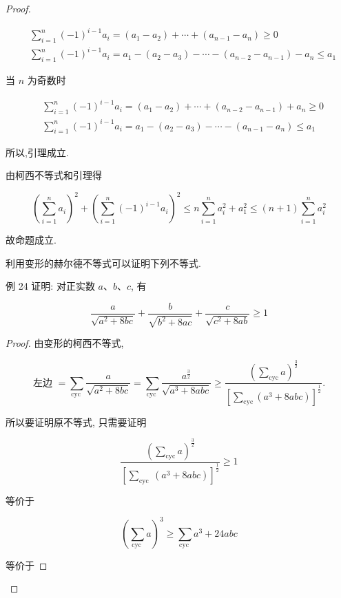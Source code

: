 \begin{proof}
\begin{example}
\begin{example}
	$$
	\begin{aligned}
	& \sum_{i=1}^{n}(-1)^{i-1} a_{i}=\left(a_{1}-a_{2}\right)+\cdots+\left(a_{n-1}-a_{n}\right) \geqslant 0 \\
	& \sum_{i=1}^{n}(-1)^{i-1} a_{i}=a_{1}-\left(a_{2}-a_{3}\right)-\cdots-\left(a_{n-2}-a_{n-1}\right)-a_{n} \leqslant a_{1}
	\end{aligned}
	$$
	
	当 $n$ 为奇数时
	
	$$
	\begin{aligned}
	& \sum_{i=1}^{n}(-1)^{i-1} a_{i}=\left(a_{1}-a_{2}\right)+\cdots+\left(a_{n-2}-a_{n-1}\right)+a_{n} \geqslant 0 \\
	& \sum_{i=1}^{n}(-1)^{i-1} a_{i}=a_{1}-\left(a_{2}-a_{3}\right)-\cdots-\left(a_{n-1}-a_{n}\right) \leqslant a_{1}
	\end{aligned}
	$$
	
	所以,引理成立.
	
	由柯西不等式和引理得
	
	$$
	\left(\sum_{i=1}^{n} a_{i}\right)^{2}+\left(\sum_{i=1}^{n}(-1)^{i-1} a_{i}\right)^{2} \leqslant n \sum_{i=1}^{n} a_{i}^{2}+a_{1}^{2} \leqslant(n+1) \sum_{i=1}^{n} a_{i}^{2}
	$$
	
	故命题成立.
	
	利用变形的赫尔德不等式可以证明下列不等式.
	
	例 24 证明: 对正实数 $a 、 b 、 c$, 有
	
	$$
	\frac{a}{\sqrt{a^{2}+8 b c}}+\frac{b}{\sqrt{b^{2}+8 a c}}+\frac{c}{\sqrt{c^{2}+8 a b}} \geqslant 1
	$$
\end{example}
\begin{proof}
	由变形的柯西不等式,
	
	$$
	\text { 左边 }=\sum_{\text {cyc }} \frac{a}{\sqrt{a^{2}+8 b c}}=\sum_{\text {cyc }} \frac{a^{\frac{3}{2}}}{\sqrt{a^{3}+8 a b c}} \geqslant \frac{\left(\sum_{\mathrm{cyc}} a\right)^{\frac{3}{2}}}{\left[\sum_{\mathrm{cyc}}\left(a^{3}+8 a b c\right)\right]^{\frac{1}{2}}} \text {. }
	$$
	
	所以要证明原不等式, 只需要证明
	
	$$
	\frac{\left(\sum_{\mathrm{cyc}} a\right)^{\frac{3}{2}}}{\left[\sum_{\text {cyc }}\left(a^{3}+8 a b c\right)\right]^{\frac{1}{2}}} \geqslant 1
	$$
	
	等价于
	
	$$
	\left(\sum_{\text {cyc }} a\right)^{3} \geqslant \sum_{\text {cyc }} a^{3}+24 a b c
	$$
	
	等价于
	

\end{proof}
\end{example}
\end{proof}
